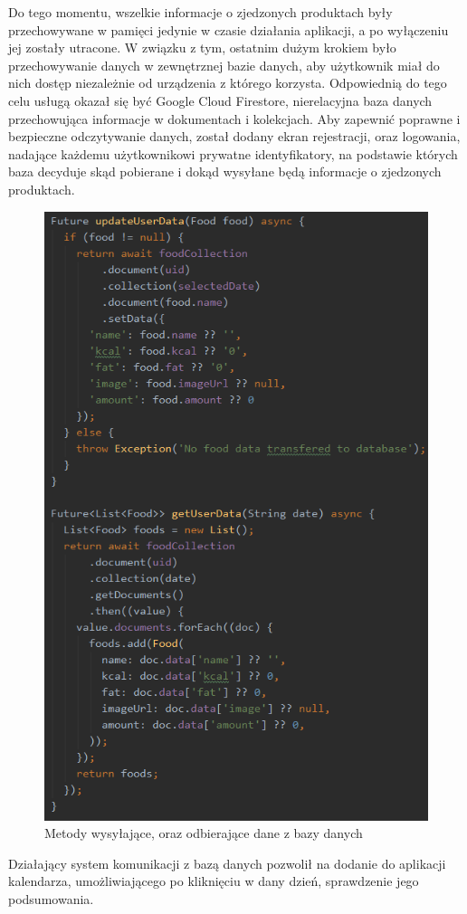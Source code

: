 \documentclass[12pt, a4paper]{article}
\begin{document}
\begin{sloppypar}
{{  Do tego momentu, wszelkie informacje o zjedzonych produktach były przechowywane w pamięci
  jedynie w czasie działania aplikacji, a po wyłączeniu jej zostały utracone. W związku z tym,
  ostatnim dużym krokiem było przechowywanie danych w zewnętrznej bazie danych, aby
  użytkownik miał do nich dostęp niezależnie od urządzenia z którego korzysta. Odpowiednią
  do tego celu usługą okazał się być Google Cloud Firestore, nierelacyjna baza danych
  przechowująca informacje w dokumentach i kolekcjach. Aby zapewnić poprawne i bezpieczne
  odczytywanie danych, został dodany ekran rejestracji, oraz logowania, nadające każdemu
  użytkownikowi prywatne identyfikatory, na podstawie których baza decyduje skąd pobierane
  i dokąd wysyłane będą informacje o zjedzonych produktach.
  \begin{figure}[H]
    \centering
    \includegraphics[scale=0.7]{app_dev_5.PNG}
    \caption{Metody wysyłające, oraz odbierające dane z bazy danych}
    \label{fig:app5}
  \end{figure}
  Działający system komunikacji z bazą danych pozwolił na dodanie do aplikacji kalendarza,
  umożliwiającego po kliknięciu w dany dzień, sprawdzenie jego podsumowania.

}}
\end{sloppypar}
\end{document}

